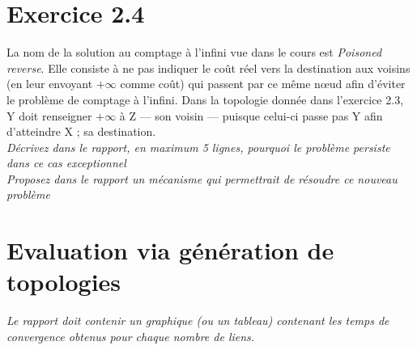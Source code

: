 \documentclass[11pt]{article}
\begin{document}
\section{Exercice 2.4}
La nom de la solution au comptage à l'infini vue dans le cours est \textit{Poisoned reverse}. Elle consiste à ne pas indiquer le coût réel vers la destination aux voisins (en leur envoyant $+\infty$ comme coût) qui passent par ce même nœud afin d'éviter le problème de comptage à l'infini. Dans la topologie donnée dans l'exercice 2.3, Y doit renseigner $+\infty$ à Z --- son voisin --- puisque celui-ci passe pas Y afin d'atteindre X ; sa destination.\\

\textit{Décrivez dans le rapport, en maximum 5 lignes, pourquoi le problème persiste dans ce cas
exceptionnel}\\

\textit{Proposez dans le rapport un mécanisme qui permettrait de résoudre ce nouveau
problème}



\section{Evaluation via génération de topologies}
\textit{Le rapport doit contenir un graphique (ou un tableau) contenant les temps de convergence obtenus
pour chaque nombre de liens.}

\vspace{10px}
\begin{center}
\end{center}

\vspace*{\fill}
\end{document}
